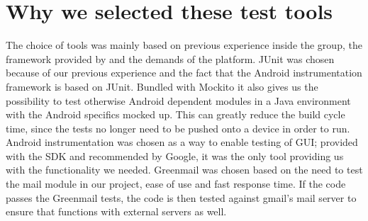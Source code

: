 \section{Why we selected these test tools}
The choice of tools was mainly based on previous experience inside the group, the framework provided by and the demands of the platform. 
\newline
\newline
JUnit was chosen because of our previous experience and the fact that the Android instrumentation framework is based on JUnit. Bundled with Mockito it also gives us the possibility to test otherwise Android dependent modules in a Java environment with the Android specifics mocked up. This can greatly reduce the build cycle time, since the tests no longer need to be pushed onto a device in order to run. 
\newline
\newline
Android instrumentation was chosen as a way to enable testing of GUI; provided with the SDK and recommended by Google, it was the only tool providing us with the functionality we needed.
\newline
\newline
Greenmail was chosen based on the need to test the mail module in our project, ease of use and fast response time. If the code passes the Greenmail tests, the code is then tested against gmail’s mail server to ensure that functions with external servers as well. 
